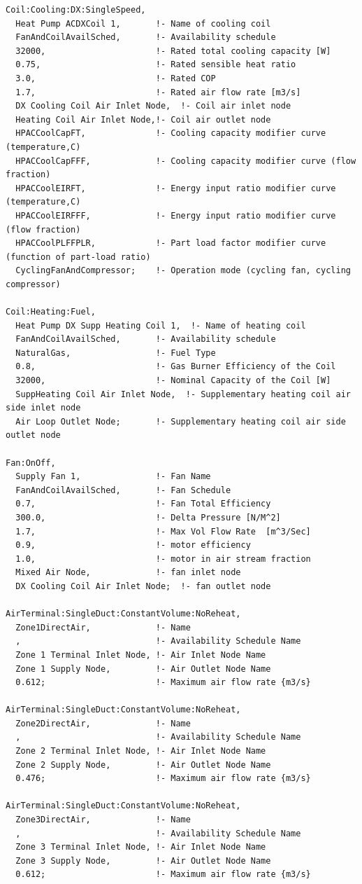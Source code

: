 \begin{lstlisting}
Coil:Cooling:DX:SingleSpeed,
  Heat Pump ACDXCoil 1,       !- Name of cooling coil
  FanAndCoilAvailSched,       !- Availability schedule
  32000,                      !- Rated total cooling capacity [W]
  0.75,                       !- Rated sensible heat ratio
  3.0,                        !- Rated COP
  1.7,                        !- Rated air flow rate [m3/s]
  DX Cooling Coil Air Inlet Node,  !- Coil air inlet node
  Heating Coil Air Inlet Node,!- Coil air outlet node
  HPACCoolCapFT,              !- Cooling capacity modifier curve (temperature,C)
  HPACCoolCapFFF,             !- Cooling capacity modifier curve (flow fraction)
  HPACCoolEIRFT,              !- Energy input ratio modifier curve (temperature,C)
  HPACCoolEIRFFF,             !- Energy input ratio modifier curve (flow fraction)
  HPACCoolPLFFPLR,            !- Part load factor modifier curve (function of part-load ratio)
  CyclingFanAndCompressor;    !- Operation mode (cycling fan, cycling compressor)

Coil:Heating:Fuel,
  Heat Pump DX Supp Heating Coil 1,  !- Name of heating coil
  FanAndCoilAvailSched,       !- Availability schedule
  NaturalGas,                 !- Fuel Type
  0.8,                        !- Gas Burner Efficiency of the Coil
  32000,                      !- Nominal Capacity of the Coil [W]
  SuppHeating Coil Air Inlet Node,  !- Supplementary heating coil air side inlet node
  Air Loop Outlet Node;       !- Supplementary heating coil air side outlet node

Fan:OnOff,
  Supply Fan 1,               !- Fan Name
  FanAndCoilAvailSched,       !- Fan Schedule
  0.7,                        !- Fan Total Efficiency
  300.0,                      !- Delta Pressure [N/M^2]
  1.7,                        !- Max Vol Flow Rate  [m^3/Sec]
  0.9,                        !- motor efficiency
  1.0,                        !- motor in air stream fraction
  Mixed Air Node,             !- fan inlet node
  DX Cooling Coil Air Inlet Node;  !- fan outlet node

AirTerminal:SingleDuct:ConstantVolume:NoReheat,
  Zone1DirectAir,             !- Name
  ,                           !- Availability Schedule Name
  Zone 1 Terminal Inlet Node, !- Air Inlet Node Name
  Zone 1 Supply Node,         !- Air Outlet Node Name
  0.612;                      !- Maximum air flow rate {m3/s}

AirTerminal:SingleDuct:ConstantVolume:NoReheat,
  Zone2DirectAir,             !- Name
  ,                           !- Availability Schedule Name
  Zone 2 Terminal Inlet Node, !- Air Inlet Node Name
  Zone 2 Supply Node,         !- Air Outlet Node Name
  0.476;                      !- Maximum air flow rate {m3/s}

AirTerminal:SingleDuct:ConstantVolume:NoReheat,
  Zone3DirectAir,             !- Name
  ,                           !- Availability Schedule Name
  Zone 3 Terminal Inlet Node, !- Air Inlet Node Name
  Zone 3 Supply Node,         !- Air Outlet Node Name
  0.612;                      !- Maximum air flow rate {m3/s}
\end{lstlisting}

